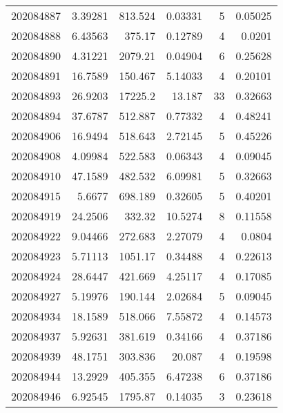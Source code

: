 \begin{tabular}{rrrrrr}
 202084887 &          3.39281 &      813.524  &            0.03331 &           5 & 0.05025 \\
 202084888 &          6.43563 &      375.17   &            0.12789 &           4 & 0.0201  \\
 202084890 &          4.31221 &     2079.21   &            0.04904 &           6 & 0.25628 \\
 202084891 &         16.7589  &      150.467  &            5.14033 &           4 & 0.20101 \\
 202084893 &         26.9203  &    17225.2    &           13.187   &          33 & 0.32663 \\
 202084894 &         37.6787  &      512.887  &            0.77332 &           4 & 0.48241 \\
 202084906 &         16.9494  &      518.643  &            2.72145 &           5 & 0.45226 \\
 202084908 &          4.09984 &      522.583  &            0.06343 &           4 & 0.09045 \\
 202084910 &         47.1589  &      482.532  &            6.09981 &           5 & 0.32663 \\
 202084915 &          5.6677  &      698.189  &            0.32605 &           5 & 0.40201 \\
 202084919 &         24.2506  &      332.32   &           10.5274  &           8 & 0.11558 \\
 202084922 &          9.04466 &      272.683  &            2.27079 &           4 & 0.0804  \\
 202084923 &          5.71113 &     1051.17   &            0.34488 &           4 & 0.22613 \\
 202084924 &         28.6447  &      421.669  &            4.25117 &           4 & 0.17085 \\
 202084927 &          5.19976 &      190.144  &            2.02684 &           5 & 0.09045 \\
 202084934 &         18.1589  &      518.066  &            7.55872 &           4 & 0.14573 \\
 202084937 &          5.92631 &      381.619  &            0.34166 &           4 & 0.37186 \\
 202084939 &         48.1751  &      303.836  &           20.087   &           4 & 0.19598 \\
 202084944 &         13.2929  &      405.355  &            6.47238 &           6 & 0.37186 \\
 202084946 &          6.92545 &     1795.87   &            0.14035 &           3 & 0.23618 \\

\end{tabular}
